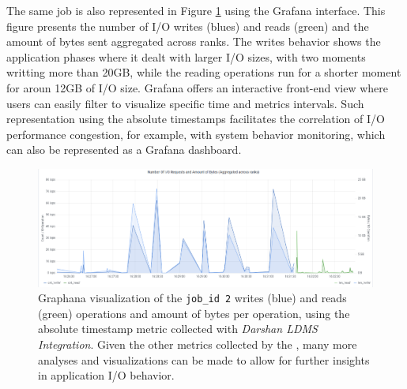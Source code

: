 The same job is also represented in Figure \ref{f:mpi_io_grafana}
using the Grafana interface. This figure presents the number of I/O
writes (blues) and reads (green) and the amount of bytes sent
aggregated across ranks. The writes behavior shows the application
phases where it dealt with larger I/O sizes, with two moments writting
more than 20GB, while the reading operations run for a shorter moment
for aroun 12GB of I/O size. Grafana offers an interactive front-end
view where users can easily filter to visualize specific time and
metrics intervals. Such representation using the absolute timestamps
facilitates the correlation of I/O performance congestion, for
example, with system behavior monitoring, which can also be
represented as a Grafana dashboard.

\begin{figure}[h!]
	\centering
	\includegraphics[width=\textwidth]{figs/255653_mpi_io_luster_no_coll.pdf}
	\caption{Graphana visualization of the \texttt{job\_id 2}
          writes (blue) and reads (green) operations and amount of bytes per
          operation, using the absolute timestamp metric collected
          with \emph{Darshan LDMS Integration}. Given the other metrics collected by the \connector, many more analyses and visualizations can be made to allow for further insights in application I/O behavior.}
	\label{f:mpi_io_grafana}
      \end{figure}
